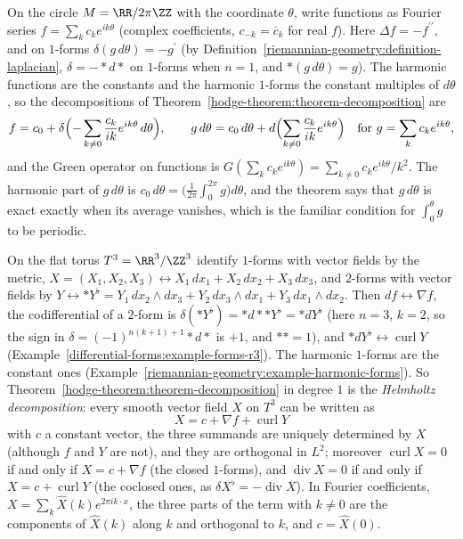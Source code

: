 \begin{example}\label{hodge-theorem:example-circle-decomposition}
On the circle $M = \RR/2\pi\ZZ$ with the coordinate $\theta$, write functions as Fourier series $f = \sum_kc_ke^{ik\theta}$ (complex coefficients, $c_{-k} = \bar c_k$ for real $f$). Here $\Delta f = -f^{\prime\prime}$,
and on $1$-forms $\delta(g\,d\theta) = -g^{\prime}$ (by Definition~\ref{riemannian-geometry:definition-laplacian}, $\delta = -{*}d{*}$ on $1$-forms when $n = 1$, and $*(g\,d\theta) = g$). The harmonic functions are the
constants and the harmonic $1$-forms the constant multiples of $d\theta$, so the decompositions of Theorem~\ref{hodge-theorem:theorem-decomposition} are
\[
f = c_0 + \delta\Bigl(-\sum_{k \neq 0}\frac{c_k}{ik}e^{ik\theta}\,d\theta\Bigr), \qquad g\,d\theta = c_0\,d\theta + d\Bigl(\sum_{k \neq 0}\frac{c_k}{ik}e^{ik\theta}\Bigr) \quad\text{for } g = \sum_kc_ke^{ik\theta},
\]
and the Green operator on functions is $G(\sum_kc_ke^{ik\theta}) = \sum_{k \neq 0}c_ke^{ik\theta}/k^2$. The harmonic part of $g\,d\theta$ is $c_0\,d\theta = \bigl(\frac{1}{2\pi}\int_0^{2\pi}g\bigr)d\theta$, and the theorem
says that $g\,d\theta$ is exact exactly when its average vanishes, which is the familiar condition for $\int_0^\theta g$ to be periodic.
\end{example}

\begin{example}\label{hodge-theorem:example-helmholtz}
On the flat torus $T^3 = \RR^3/\ZZ^3$ identify $1$-forms with vector fields by the metric, $X = (X_1, X_2, X_3) \leftrightarrow X_1\,dx_1 + X_2\,dx_2 + X_3\,dx_3$, and $2$-forms with vector fields by
$Y \leftrightarrow *Y^\flat = Y_1\,dx_2 \wedge dx_3 + Y_2\,dx_3 \wedge dx_1 + Y_3\,dx_1 \wedge dx_2$. Then $df \leftrightarrow \nabla f$, the codifferential of a $2$-form is $\delta(*Y^\flat) = *d{*}{*}Y^\flat = *dY^\flat$
(here $n = 3$, $k = 2$, so the sign in $\delta = (-1)^{n(k+1)+1}*d*$ is $+1$, and $** = 1$), and $*dY^\flat \leftrightarrow \operatorname{curl}Y$ (Example~\ref{differential-forms:example-forms-r3}). The harmonic
$1$-forms are the constant ones (Example~\ref{riemannian-geometry:example-harmonic-forms}). So Theorem~\ref{hodge-theorem:theorem-decomposition} in degree $1$ is the \emph{Helmholtz decomposition}:
every smooth vector field $X$ on $T^3$ can be written as
\[
X = c + \nabla f + \operatorname{curl}Y
\]
with $c$ a constant vector, the three summands are uniquely determined by $X$ (although $f$ and $Y$ are not), and they are orthogonal in $L^2$; moreover $\operatorname{curl}X = 0$ if and only if $X = c + \nabla f$ (the closed $1$-forms), and $\operatorname{div}X = 0$ if
and only if $X = c + \operatorname{curl}Y$ (the coclosed ones, as $\delta X^\flat = -\operatorname{div}X$). In Fourier coefficients, $X = \sum_k\hat X(k)e^{2\pi ik\cdot x}$, the three parts of the term with
$k \neq 0$ are the components of $\hat X(k)$ along $k$ and orthogonal to $k$, and $c = \hat X(0)$.
\end{example}

